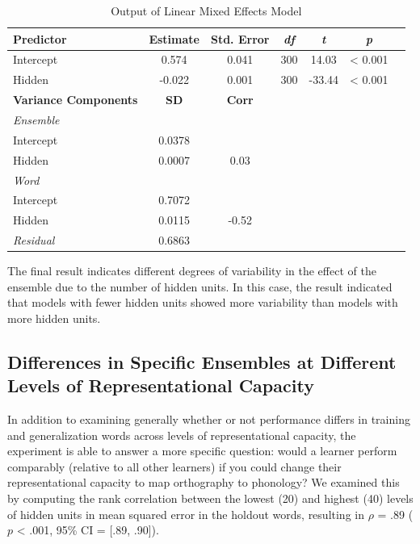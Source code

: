 \documentclass[
  ,man,floatsintext]{apa6}
\begin{document}
\begin{table}[ht]
\centering
\caption{Output of Linear Mixed Effects Model}
\begin{tabular}{lcccccc}
\toprule
\textbf{Predictor} & \textbf{Estimate} & \textbf{Std. Error} & \textit{df} & \textit{t} & \textit{p} \\
\midrule
Intercept & 0.574 & 0.041 & 300 & 14.03 & < 0.001 \\
Hidden & -0.022 & 0.001 & 300 & -33.44 & < 0.001 \\
\midrule
\textbf{Variance Components} & \textbf{SD} & \textbf{Corr} & & & \\
\midrule
\multicolumn{6}{l}{\textit{Ensemble}} \\
\hspace{1em}Intercept & 0.0378 & & & & \\
\hspace{1em}Hidden & 0.0007 & 0.03 & & & \\
\midrule
\multicolumn{6}{l}{\textit{Word}} \\
\hspace{1em}Intercept & 0.7072 & & & & \\
\hspace{1em}Hidden & 0.0115 & -0.52 & & & \\
\textit{Residual} & 0.6863 & & & & \\
\bottomrule
\end{tabular}
\end{table}

The final result indicates different degrees of variability in the effect of the ensemble due to the number of hidden units. In this case, the result indicated that models with fewer hidden units showed more variability than models with more hidden units.

\subsection{Differences in Specific Ensembles at Different Levels of Representational Capacity}\label{differences-in-specific-ensembles-at-different-levels-of-representational-capacity}

In addition to examining generally whether or not performance differs in training and generalization words across levels of representational capacity, the experiment is able to answer a more specific question: would a learner perform comparably (relative to all other learners) if you could change their representational capacity to map orthography to phonology? We examined this by computing the rank correlation between the lowest (20) and highest (40) levels of hidden units in mean squared error in the holdout words, resulting in \(\rho\) = .89 (\(p\) \textless{} .001, 95\% CI = {[}.89, .90{]}).
\end{document}
